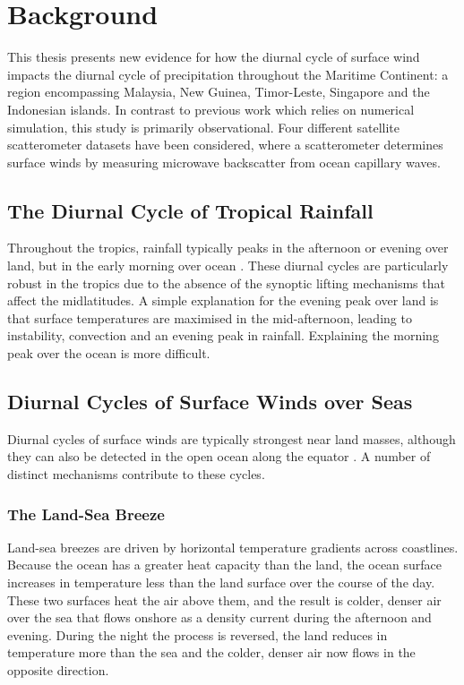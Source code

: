 \documentclass[12pt]{book}
\begin{document}

\newpage

\mainmatter


\chapter{Background}
\label{Ch:Background}
This thesis presents new evidence for how the diurnal cycle of surface wind impacts the diurnal cycle of precipitation throughout the Maritime Continent: a region encompassing Malaysia, New Guinea, Timor-Leste, Singapore and the Indonesian islands. In contrast to previous work which relies on numerical simulation, this study is primarily observational. Four different satellite scatterometer datasets have been considered, where a scatterometer determines surface winds by measuring microwave backscatter from ocean capillary waves. 

\section{The Diurnal Cycle of Tropical Rainfall}
Throughout the tropics, rainfall typically peaks in the afternoon or evening over land, but in the early morning over ocean \citep{yang01}. These diurnal cycles are particularly robust in the tropics due to the absence of the synoptic lifting mechanisms that affect the midlatitudes. A simple explanation for the evening peak over land is that surface temperatures are maximised in the mid-afternoon, leading to instability, convection and an evening peak in rainfall. Explaining the morning peak over the ocean is more difficult.             

\section{Diurnal Cycles of Surface Winds over Seas}
Diurnal cycles of surface winds are typically strongest near land masses, although they can also be detected in the open ocean along the equator \citep{gille05}. A number of distinct mechanisms contribute to these cycles.

\subsection{The Land-Sea Breeze}
\label{Sec:Breeze}
Land-sea breezes are driven by horizontal temperature gradients across coastlines. Because the ocean has a greater heat capacity than the land, the ocean surface increases in temperature less than the land surface over the course of the day. These two surfaces heat the air above them, and the result is colder, denser air over the sea that flows onshore as a density current during the afternoon and evening. During the night the process is reversed, the land reduces in temperature more than the sea and the colder, denser air now flows in the opposite direction. 
\end{document}
